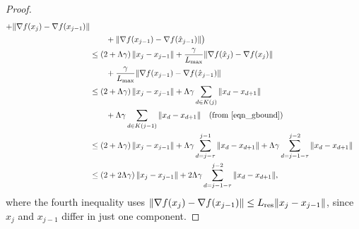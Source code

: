 \documentclass{siamltex}
\begin{document}
\begin{proof}
\begin{align}
 + \|\nabla f(x_j)  - \nabla f(x_{j-1})\| 
\\ \nonumber & \quad\quad  
+ \|\nabla f(x_{j-1}) - \nabla f({\hat{x}}_{j-1})\| \big) \\
\nonumber
&\leq \left(2+{\Lambda\gamma}\right)\|x_j-x_{j-1}\| + {\gamma \over {L_{\mbox{\rm\scriptsize max}}}} \|\nabla f({\hat{x}}_{j}) - \nabla f(x_j)\| 
\\ \nonumber
&\quad \quad
+ {\gamma \over {L_{\mbox{\rm\scriptsize max}}}}\|\nabla f(x_{j-1}) - \nabla f({\hat{x}}_{j-1})\| \\
\nonumber
&\leq \left(2+{\Lambda\gamma}\right)\|x_j-x_{j-1}\| + {\Lambda\gamma}\sum_{d\in K(j)}\|x_d - x_{d+1}\| 
\\ &\quad \quad
+ {\Lambda\gamma}\sum_{d\in K(j-1)}\|x_d - x_{d+1}\| \quad (\text{from \eqref{eqn_gbound}})
\label{eqn_proof2_2} \\
\nonumber
&\leq \left(2+{\Lambda\gamma}\right)\|x_j-x_{j-1}\| + {\Lambda\gamma}\sum_{d=j-\tau}^{j-1}\|x_d - x_{d+1}\| + {\Lambda\gamma}\sum_{d=j-1-\tau}^{j-2}\|x_d - x_{d+1}\| \\
&\leq \left(2+2{\Lambda\gamma}\right)\|x_j-x_{j-1}\| + 2{\Lambda\gamma}\sum_{d=j-1-\tau}^{j-2}\|x_d - x_{d+1}\|,
\label{eqn_proof2_2add}
\end{align}
where 
the fourth inequality uses $\|\nabla f(x_j) - \nabla f(x_{j-1})\| \leq
{L_{\mbox{\rm\scriptsize res}}} \|x_j- x_{j-1}\|$, since $x_j$ and $x_{j-1}$ differ in just one
component.


\end{proof}
\end{document}
